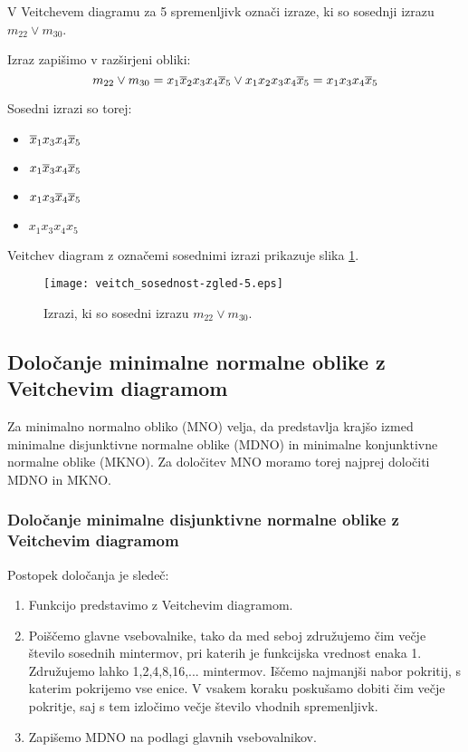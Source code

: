 \begin{zgled}
V Veitchevem diagramu za 5 spremenljivk označi izraze, ki so sosednji izrazu $m_{22} \vee m_{30}$.\\
\end{zgled}
\begin{resitev}
Izraz zapišimo v razširjeni obliki: 
$$ m_{22} \vee m_{30} = x_1 \overline x_2 x_3 x_4 \overline x_5 \vee x_1 x_2 x_3 x_4 \overline x_5 = x_1 x_3 x_4 \overline x_5$$

Sosedni izrazi so torej:
\begin{itemize}
\item $\overline x_1 x_3 x_4 \overline x_5$
\item $x_1 \overline x_3 x_4 \overline x_5$
\item $x_1 x_3 \overline x_4 \overline x_5$
\item $x_1 x_3 x_4 x_5$
\end{itemize}

Veitchev diagram z označemi sosednimi izrazi prikazuje slika \ref{fig:Veitch_sosednost_zgled_5}.

\begin{figure}[ht]
\begin{center}
	\texttt{[image: veitch\_sosednost-zgled-5.eps]}
\end{center}
\caption{Izrazi, ki so sosedni izrazu $m_{22} \vee m_{30}$.}
\label{fig:Veitch_sosednost_zgled_5}
\end{figure}

\end{resitev}


\subsection{Določanje minimalne normalne oblike z Veitchevim diagramom}

Za minimalno normalno obliko (MNO) velja, da predstavlja krajšo izmed minimalne disjunktivne normalne oblike (MDNO) in minimalne konjunktivne normalne oblike (MKNO). Za določitev MNO moramo torej najprej določiti MDNO in MKNO.

\subsubsection{Določanje minimalne disjunktivne normalne oblike z Veitchevim diagramom}
Postopek določanja je sledeč:
\begin{enumerate}
\item Funkcijo predstavimo z Veitchevim diagramom.
\item Poiščemo glavne vsebovalnike, tako da med seboj združujemo čim večje število sosednih mintermov, pri katerih je funkcijska vrednost enaka 1. Združujemo lahko 1,2,4,8,16,... mintermov. Iščemo najmanjši nabor pokritij, s katerim pokrijemo vse enice. V vsakem koraku poskušamo dobiti čim večje pokritje, saj s tem izločimo večje število vhodnih spremenljivk.
\item Zapišemo MDNO na podlagi glavnih vsebovalnikov.
\end{enumerate}

